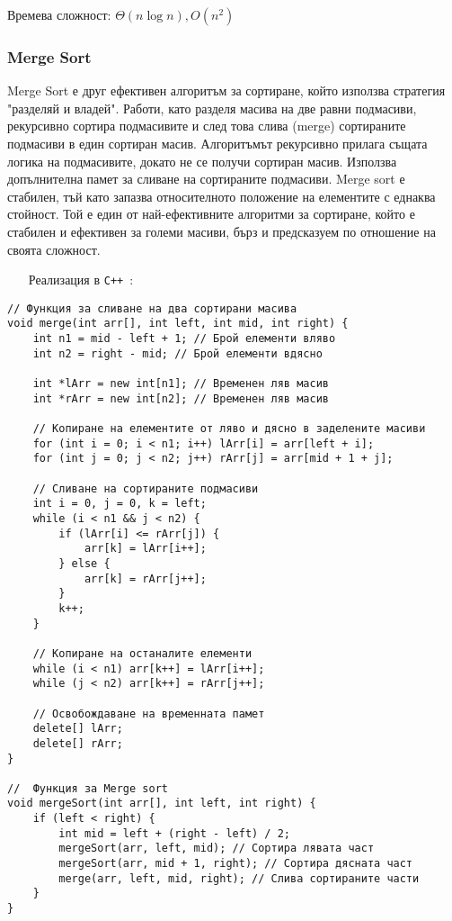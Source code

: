 \documentclass[oneside]{book}
\newcommand*{\cpp}{\texttt{C++}\ }
\begin{document}
Времева сложност: $\Theta(n\log n), O(n^2)$

\subsubsection{Merge Sort}
Merge Sort е друг ефективен алгоритъм за сортиране, който използва стратегия "разделяй и владей".
Работи, като разделя масива на две равни подмасиви, рекурсивно сортира подмасивите и след това слива (merge) сортираните подмасиви в един сортиран масив.
Алгоритъмът рекурсивно прилага същата логика на подмасивите, докато не се получи сортиран масив.
Използва допълнителна памет за сливане на сортираните подмасиви.
Merge sort е стабилен, тъй като запазва относителното положение на елементите с еднаква стойност.
Той е един от най-ефективните алгоритми за сортиране, който е стабилен и ефективен за големи масиви, бърз и предсказуем по отношение на своята сложност.

\begin{itemize}\item[Реализация] в \cpp:\end{itemize}
\begin{mdframed}\begin{lstlisting}
// Функция за сливане на два сортирани масива
void merge(int arr[], int left, int mid, int right) {
    int n1 = mid - left + 1; // Брой елементи вляво
    int n2 = right - mid; // Брой елементи вдясно

    int *lArr = new int[n1]; // Временен ляв масив
    int *rArr = new int[n2]; // Временен ляв масив

    // Копиране на елементите от ляво и дясно в заделените масиви
    for (int i = 0; i < n1; i++) lArr[i] = arr[left + i];
    for (int j = 0; j < n2; j++) rArr[j] = arr[mid + 1 + j];

    // Сливане на сортираните подмасиви
    int i = 0, j = 0, k = left;
    while (i < n1 && j < n2) {
        if (lArr[i] <= rArr[j]) {
            arr[k] = lArr[i++];
        } else {
            arr[k] = rArr[j++];
        }
        k++;
    }

    // Копиране на останалите елементи
    while (i < n1) arr[k++] = lArr[i++];
    while (j < n2) arr[k++] = rArr[j++];

    // Освобождаване на временната памет
    delete[] lArr;
    delete[] rArr;
}

//  Функция за Merge sort
void mergeSort(int arr[], int left, int right) {
    if (left < right) {
        int mid = left + (right - left) / 2;
        mergeSort(arr, left, mid); // Сортира лявата част
        mergeSort(arr, mid + 1, right); // Сортира дясната част
        merge(arr, left, mid, right); // Слива сортираните части
    }
}                      
\end{lstlisting}\end{mdframed}
\end{document}
